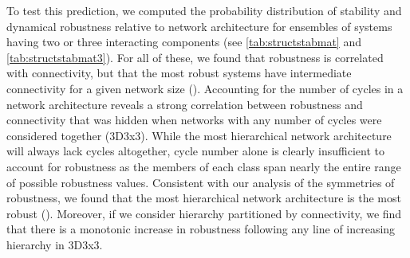 To test this prediction, we computed the probability distribution of stability and dynamical robustness relative to network architecture for ensembles of systems having two or three interacting components (see \ref{tab:structstabmat} and \ref{tab:structstabmat3}). For all of these, we found that robustness is correlated with connectivity, but that the most robust systems have intermediate connectivity for a given network size (). Accounting for the number of cycles in a network architecture reveals a strong correlation between robustness and connectivity that was hidden when networks with any number of cycles were considered together (3D3x3). While the most hierarchical network architecture will always lack cycles altogether, cycle number alone is clearly insufficient to account for robustness as the members of each class span nearly the entire range of possible robustness values. Consistent with our analysis of the symmetries of robustness, we found that the most hierarchical network architecture is the most robust (). Moreover, if we consider hierarchy partitioned by connectivity, we find that there is a monotonic increase in robustness following any line of increasing hierarchy in 3D3x3.
